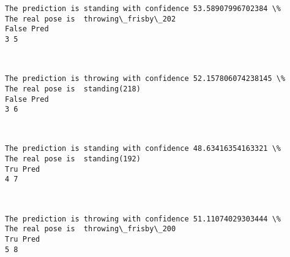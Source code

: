 \documentclass[11pt]{article}
\begin{document}
    \begin{Verbatim}[commandchars=\\\{\}]
The prediction is standing with confidence 53.58907996702384 \%
The real pose is  throwing\_frisby\_202
False Pred
3 5

    \end{Verbatim}

    \begin{center}
    \end{center}
    { \hspace*{\fill} \\}
    
    \begin{Verbatim}[commandchars=\\\{\}]
The prediction is throwing with confidence 52.157806074238145 \%
The real pose is  standing(218)
False Pred
3 6

    \end{Verbatim}

    \begin{center}
    \end{center}
    { \hspace*{\fill} \\}
    
    \begin{Verbatim}[commandchars=\\\{\}]
The prediction is standing with confidence 48.63416354163321 \%
The real pose is  standing(192)
Tru Pred
4 7

    \end{Verbatim}

    \begin{center}
    \end{center}
    { \hspace*{\fill} \\}
    
    \begin{Verbatim}[commandchars=\\\{\}]
The prediction is throwing with confidence 51.11074029303444 \%
The real pose is  throwing\_frisby\_200
Tru Pred
5 8

    \end{Verbatim}

    \begin{center}
    \end{center}
    { \hspace*{\fill} \\}
    
\end{document}
